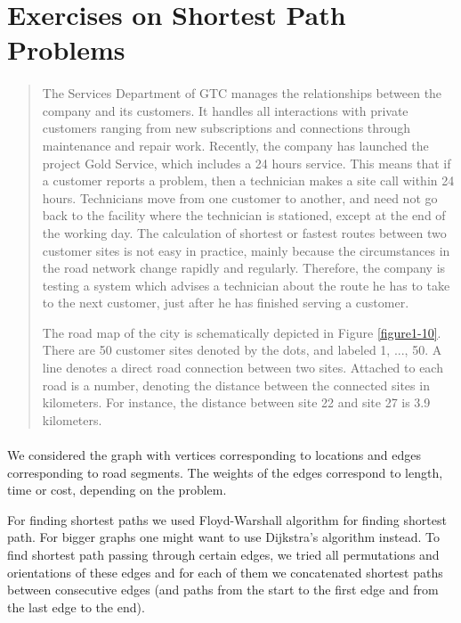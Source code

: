 \section{Exercises on Shortest Path Problems}

\paragraph{}
\begin{quote}
The Services Department of GTC manages the relationships between the company and its customers. It handles all interactions with private customers ranging from new subscriptions and connections through maintenance and repair work. Recently, the company has launched the project Gold Service, which includes a 24 hours service. This means that if a customer reports a problem, then a technician makes a site call within 24 hours. Technicians move from one customer to another, and need not go back to the facility where the technician is stationed, except at the end of the working day. The calculation of shortest or fastest routes between two customer sites is not easy in practice, mainly because the circumstances in the road network change rapidly and regularly. Therefore, the company is testing a system which advises a technician about the route he has to take to the next customer, just after he has finished serving a customer.

The road map of the city is schematically depicted in Figure \ref{figure1-10}. There are 50 customer sites denoted by the dots, and labeled 1, ..., 50. A line denotes a direct road connection between two sites. Attached to each road is a number, denoting the distance between the connected sites in kilometers. For instance, the distance between site 22 and site 27 is 3.9 kilometers.
\end{quote}

\paragraph{}
We considered the graph with vertices corresponding to locations and edges corresponding to road segments. The weights of the edges correspond to length, time or cost, depending on the problem.

For finding shortest paths we used Floyd-Warshall algorithm for finding shortest path. For bigger graphs one might want to use Dijkstra’s algorithm instead. To find shortest path passing through certain edges, we tried all permutations and orientations of these edges and for each of them we concatenated shortest paths between consecutive edges (and paths from the start to the first edge and from the last edge to the end).

